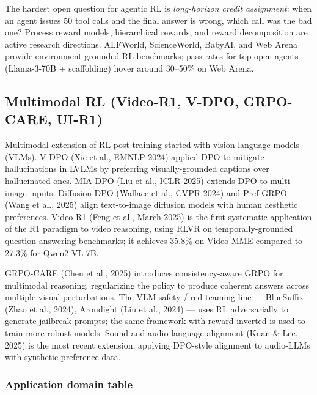 The hardest open question for agentic RL is \emph{long-horizon credit assignment}: when an agent issues 50 tool calls and the final answer is wrong, which call was the bad one? Process reward models, hierarchical rewards, and reward decomposition are active research directions. ALFWorld, ScienceWorld, BabyAI, and Web Arena provide environment-grounded RL benchmarks; pass rates for top open agents (Llama-3-70B + scaffolding) hover around 30--50\% on Web Arena.

\subsection{Multimodal RL (Video-R1, V-DPO, GRPO-CARE, UI-R1)}\label{multimodal-rl-video-r1-v-dpo-grpo-care-ui-r1}

Multimodal extension of RL post-training started with vision-language models (VLMs). V-DPO (Xie et al., EMNLP 2024) applied DPO to mitigate hallucinations in LVLMs by preferring visually-grounded captions over hallucinated ones. MIA-DPO (Liu et al., ICLR 2025) extends DPO to multi-image inputs. Diffusion-DPO (Wallace et al., CVPR 2024) and Pref-GRPO (Wang et al., 2025) align text-to-image diffusion models with human aesthetic preferences. Video-R1 (Feng et al., March 2025) is the first systematic application of the R1 paradigm to video reasoning, using RLVR on temporally-grounded question-answering benchmarks; it achieves 35.8\% on Video-MME compared to 27.3\% for Qwen2-VL-7B.

GRPO-CARE (Chen et al., 2025) introduces consistency-aware GRPO for multimodal reasoning, regularizing the policy to produce coherent answers across multiple visual perturbations. The VLM safety / red-teaming line --- BlueSuffix (Zhao et al., 2024), Arondight (Liu et al., 2024) --- uses RL adversarially to generate jailbreak prompts; the same framework with reward inverted is used to train more robust models. Sound and audio-language alignment (Kuan \& Lee, 2025) is the most recent extension, applying DPO-style alignment to audio-LLMs with synthetic preference data.

\subsubsection{Application domain table}\label{application-domain-table}

